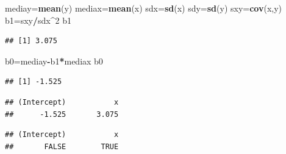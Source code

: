 \documentclass[
]{article}
\newenvironment{Shaded}{\begin{snugshade}}{\end{snugshade}}
\newcommand{\CommentTok}[1]{\textcolor[rgb]{0.56,0.35,0.01}{\textit{#1}}}
\newcommand{\DecValTok}[1]{\textcolor[rgb]{0.00,0.00,0.81}{#1}}
\newcommand{\KeywordTok}[1]{\textcolor[rgb]{0.13,0.29,0.53}{\textbf{#1}}}
\newcommand{\NormalTok}[1]{#1}
\newcommand{\OperatorTok}[1]{\textcolor[rgb]{0.81,0.36,0.00}{\textbf{#1}}}
\begin{document}
\begin{Shaded}
\begin{Highlighting}[]
\NormalTok{mediay=}\KeywordTok{mean}\NormalTok{(y)}
\NormalTok{mediax=}\KeywordTok{mean}\NormalTok{(x)}
\NormalTok{sdx=}\KeywordTok{sd}\NormalTok{(x)}
\NormalTok{sdy=}\KeywordTok{sd}\NormalTok{(y)}
\NormalTok{sxy=}\KeywordTok{cov}\NormalTok{(x,y)}
\NormalTok{b1=sxy}\OperatorTok{/}\NormalTok{sdx}\OperatorTok{^}\DecValTok{2}
\NormalTok{b1}
\end{Highlighting}
\end{Shaded}

\begin{verbatim}
## [1] 3.075
\end{verbatim}

\begin{Shaded}
\begin{Highlighting}[]
\NormalTok{b0=mediay}\OperatorTok{-}\NormalTok{b1}\OperatorTok{*}\NormalTok{mediax}
\NormalTok{b0}
\end{Highlighting}
\end{Shaded}

\begin{verbatim}
## [1] -1.525
\end{verbatim}

\begin{Shaded}
\end{Shaded}

\begin{verbatim}
## (Intercept)           x 
##      -1.525       3.075
\end{verbatim}

\begin{Shaded}
\end{Shaded}

\begin{verbatim}
## (Intercept)           x 
##       FALSE        TRUE
\end{verbatim}

\begin{Shaded}
\end{Shaded}
\end{document}
